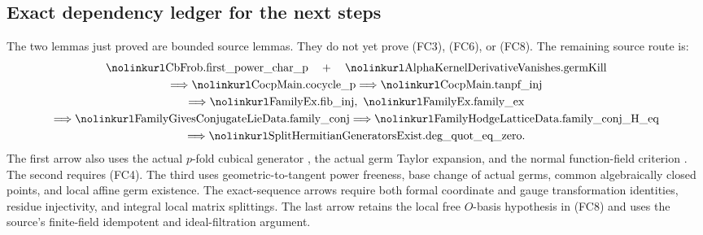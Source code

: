 \subsection{Exact dependency ledger for the next steps}
\label{subsec:faithful-frobenius-initial-ledger}

The two lemmas just proved are bounded source lemmas.
They do not yet prove (FC3), (FC6), or (FC8).
The remaining source route is:
\[
 \begin{gathered}
 \srcid{CbFrob.first\_power\_char\_p}
 \quad+\quad
 \srcid{AlphaKernelDerivativeVanishes.germKill}\\
 \Longrightarrow
 \srcid{CocpMain.cocycle\_p}
 \Longrightarrow
 \srcid{CocpMain.tanpf\_inj}\\
 \Longrightarrow
 \srcid{FamilyEx.fib\_inj},\ \srcid{FamilyEx.family\_ex}\\
 \Longrightarrow
 \srcid{FamilyGivesConjugateLieData.family\_conj}
 \Longrightarrow
 \srcid{FamilyHodgeLatticeData.family\_conj\_H\_eq}\\
 \Longrightarrow
 \srcid{SplitHermitianGeneratorsExist.deg\_quot\_eq\_zero}.
 \end{gathered}
\]
The first arrow also uses the actual \(p\)-fold cubical
generator , the actual germ Taylor expansion,
and the normal function-field criterion
.
The second requires (FC4).
The third uses geometric-to-tangent power freeness,
base change of actual germs, common algebraically closed
points, and local affine germ existence.
The exact-sequence arrows require both formal coordinate
and gauge transformation identities, residue injectivity,
and integral local matrix splittings.
The last arrow retains the local free \(O\)-basis hypothesis
in (FC8) and uses the source's finite-field idempotent and
ideal-filtration argument.

